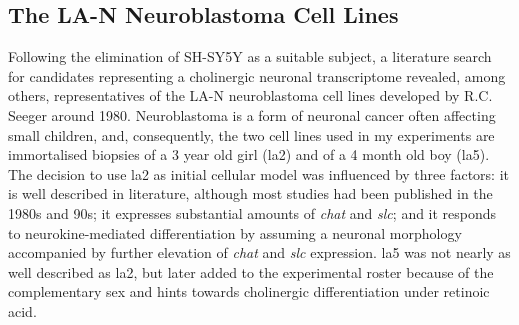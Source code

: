 \subsection{The LA-N Neuroblastoma Cell Lines}
Following the elimination of SH-SY5Y as a suitable subject, a literature search for candidates representing a cholinergic neuronal transcriptome revealed, among others, representatives of the LA-N neuroblastoma cell lines developed by R.C. Seeger around 1980.\cite{Seeger1977, Seeger1982} Neuroblastoma is a form of neuronal cancer often affecting small children, and, consequently, the two cell lines used in my experiments are immortalised biopsies of a 3 year old girl (\acs{la2}\cite{Seeger1977}) and of a 4 month old boy (\mbox{\acs{la5}}\cite{Seeger1982}). The decision to use \ac{la2} as initial cellular model was influenced by three factors: it is well described in literature, although most studies had been published in the 1980s and 90s; it expresses substantial amounts of \textit{\ac{chat}} and \textit{\ac{slc}};\cite{} and it responds to neurokine-mediated differentiation by assuming a neuronal morphology accompanied by further elevation of \textit{\ac{chat}} and \textit{\ac{slc}} expression. \ac{la5} was not nearly as well described as \ac{la2}, but later added to the experimental roster because of the complementary sex and hints towards cholinergic differentiation under retinoic acid.\cite{Hill1997}

